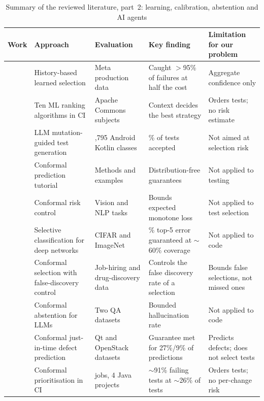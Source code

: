 \documentclass[11pt]{article}
\begin{document}
\begin{table}[htbp]
\caption{Summary of the reviewed literature, part~2: learning, calibration, abstention and AI agents}
\label{tab:survey2}
\centering
\footnotesize
\renewcommand{\arraystretch}{1.15}
\begin{tabular}{@{}>{\raggedright\arraybackslash}p{}>{\raggedright\arraybackslash}p{}>{\raggedright\arraybackslash}p{}>{\raggedright\arraybackslash}p{}>{\raggedright\arraybackslash}p{}@{}}
\toprule
\textbf{Work} & \textbf{Approach} & \textbf{Evaluation} & \textbf{Key finding} & \textbf{Limitation for our problem} \\
\midrule
\cite{machalica2019pts} & History-based learned selection & Meta production data & Caught $>$95\% of failures at half the cost & Aggregate confidence only \\
\cite{bertolino2020learning} & Ten ML ranking algorithms in CI & Apache Commons subjects & Context decides the best strategy & Orders tests; no risk estimate \\
\cite{foster2025ach} & LLM mutation-guided test generation & 10,795 Android Kotlin classes & 73\% of tests accepted & Not aimed at selection risk \\
\cite{angelopoulos2023gentle} & Conformal prediction tutorial & Methods and examples & Distribution-free guarantees & Not applied to testing \\
\cite{angelopoulos2024crc} & Conformal risk control & Vision and NLP tasks & Bounds expected monotone loss & Not applied to test selection \\
\cite{geifman2017selective} & Selective classification for deep networks & CIFAR and ImageNet & 2\% top-5 error guaranteed at ${\sim}$60\% coverage & Not applied to code \\
\cite{jin2023selection} & Conformal selection with false-discovery control & Job-hiring and drug-discovery data & Controls the false discovery rate of a selection & Bounds false selections, not missed ones \\
\cite{yadkori2024abstention} & Conformal abstention for LLMs & Two QA datasets & Bounded hallucination rate & Not applied to code \\
\cite{shahini2024jitcp} & Conformal just-in-time defect prediction & Qt and OpenStack datasets & Guarantee met for 27\%/9\% of predictions & Predicts defects; does not select tests \\
\cite{altinisik2026conformal} & Conformal prioritisation in CI & 273 jobs, 4 Java projects & ${\sim}$91\% failing tests at ${\sim}$26\% of tests & Orders tests; no per-change risk \\

\end{tabular}
\end{table}
\end{document}
